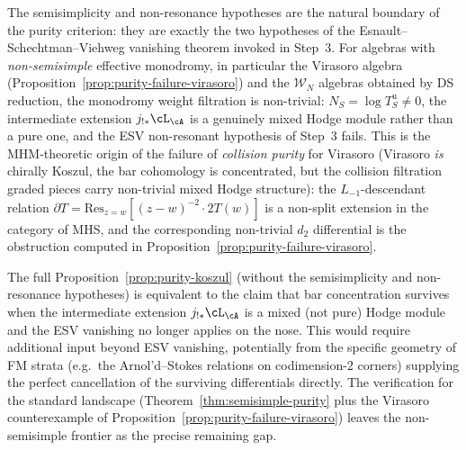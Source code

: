 \begin{remark}
\label{rem:purity-scope}
The semisimplicity and non-resonance hypotheses are the natural
boundary of the purity criterion: they are exactly the two
hypotheses of the Esnault--Schechtman--Viehweg vanishing theorem
invoked in Step~3. For algebras with \emph{non-semisimple} effective
monodromy, in particular the Virasoro algebra
(Proposition~\ref{prop:purity-failure-virasoro}) and the
$\mathcal{W}_N$ algebras obtained by DS reduction, the
monodromy weight filtration is non-trivial:
$N_S = \log T_S^{\mathrm u} \neq 0$, the intermediate extension
$j_{!*}\cL_\cA$ is a genuinely mixed Hodge module rather than a pure
one, and the ESV non-resonant hypothesis of Step~3 fails. This is the
MHM-theoretic origin of the failure of \emph{collision purity} for
Virasoro (Virasoro \emph{is} chirally Koszul, the bar cohomology is
concentrated, but the collision filtration graded pieces carry
non-trivial mixed Hodge structure):
the $L_{-1}$-descendant relation
$\partial T = \mathrm{Res}_{z=w}[(z-w)^{-2}\cdot 2T(w)]$
is a non-split extension in the category of MHS, and the corresponding
non-trivial $d_2$ differential is the obstruction computed in
Proposition~\ref{prop:purity-failure-virasoro}.

The full Proposition~\ref{prop:purity-koszul} (without the
semisimplicity and non-resonance hypotheses) is equivalent to the
claim that bar concentration survives when the intermediate extension
$j_{!*}\cL_\cA$ is a mixed (not pure) Hodge module and the ESV
vanishing no longer applies on the nose. This would require additional
input beyond ESV vanishing, potentially from the specific geometry of
FM strata (e.g.\ the Arnol'd--Stokes relations on codimension-$2$
corners) supplying the perfect cancellation of the surviving
differentials directly.
The verification for the standard landscape
(Theorem~\ref{thm:semisimple-purity} plus the Virasoro
counterexample of Proposition~\ref{prop:purity-failure-virasoro})
leaves the non-semisimple frontier as the precise remaining gap.
\end{remark}

